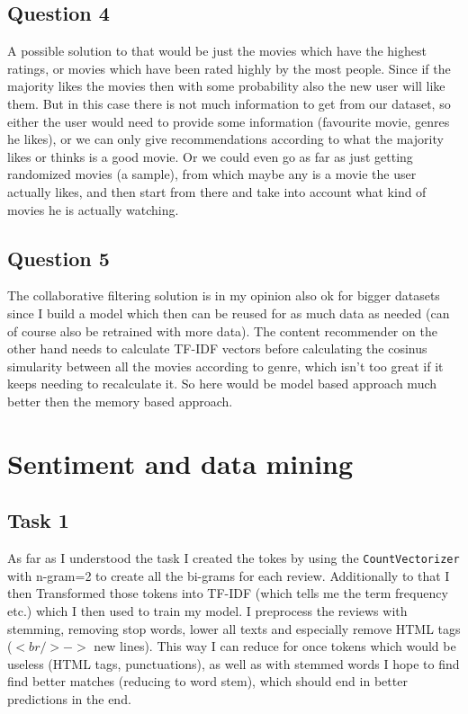 \documentclass[11pt,a4paper]{article}
\begin{document}
\subsection{Question 4}
A possible solution to that would be just the movies which have the highest ratings, or movies which have been rated highly by the most people.
Since if the majority likes the movies then with some probability also the new user will like them.
But in this case there is not much information to get from our dataset, so either the user would need to provide some information (favourite movie, genres he likes), or we can only give recommendations according to what the majority likes or thinks is a good movie.
Or we could even go as far as just getting randomized movies (a sample), from which maybe any is a movie the user actually likes, and then start from there and take into account what kind of movies he is actually watching.

\subsection{Question 5}

The collaborative filtering solution is in my opinion also ok for bigger datasets since I build a model which then can be reused for as much data as needed (can of course also be retrained with more data).
The content recommender on the other hand needs to calculate TF-IDF vectors before calculating the cosinus simularity between all the movies according to genre, which isn't too great if it keeps needing to recalculate it.
So here would be model based approach much better then the memory based approach.


\section{Sentiment and data mining}

\subsection{Task 1}
As far as I understood the task I created the tokes by using the \texttt{CountVectorizer} with n-gram=2 to create all the bi-grams for each review.
Additionally to that I then Transformed those tokens into TF-IDF (which tells me the term frequency etc.) which I then used to train my model.
I preprocess the reviews with stemming, removing stop words, lower all texts and especially remove HTML tags ($<br /> ->$ new lines).
This way I can reduce for once tokens which would be useless (HTML tags, punctuations), as well as with stemmed words I hope to find find better matches (reducing to word stem), which should end in better predictions in the end.
\end{document}
